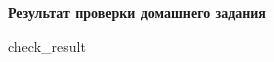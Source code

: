 \documentclass[12pt]{article}
\begin{document}
\begin{center}
{\LARGE\bfseries Результат проверки домашнего задания}
\end{center}

\vspace{0.8em}

{{ check_result }}
\end{document}

